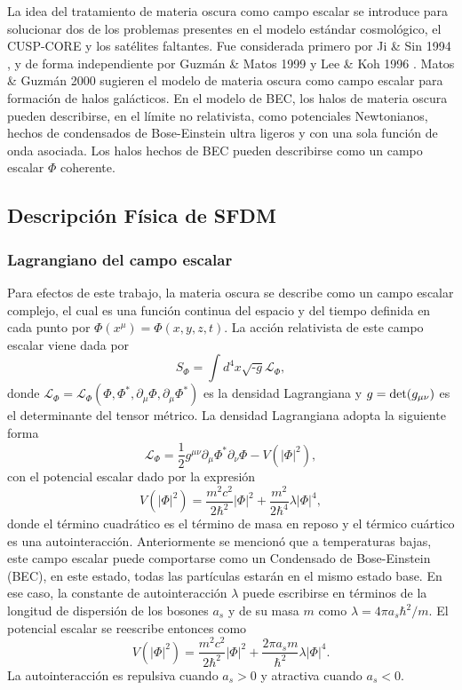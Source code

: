\documentclass[a4paper,openright,10pt, oneside, final]{book}
\begin{document}
La idea del tratamiento de materia oscura como campo escalar se introduce para solucionar dos de los problemas presentes en el modelo estándar cosmológico, el CUSP-CORE y los satélites faltantes. Fue considerada primero por Ji \& Sin 1994 \cite{1.3.01}, y de forma independiente por Guzmán \& Matos 1999 \cite{Siddhartha Matos} y Lee \& Koh 1996 \cite{1.3.02}. Matos \& Guzmán 2000 \cite{1.3.03} sugieren el modelo de materia oscura como campo escalar para formación de halos galácticos. En el modelo de BEC, los halos de materia oscura pueden describirse, en el límite no relativista, como potenciales Newtonianos, hechos de condensados de Bose-Einstein ultra ligeros y con una sola función de onda asociada. Los halos hechos de BEC pueden describirse como un campo escalar $\Phi$ coherente.


\subsection{Descripción Física de SFDM}
\subsubsection{Lagrangiano del campo escalar}
Para efectos de este trabajo, la materia oscura se describe como un campo escalar complejo, el cual es una función continua del espacio y del tiempo definida en cada punto por $\Phi(x^{\mu}) = \Phi(x, y, z, t) $. La acción relativista de este campo escalar viene dada por \cite{1.3.03.1} \begin{equation}
S_{\Phi} = \int d^{4}x\sqrt{\textbf{-} g}\mathcal{L}_{\Phi},\label{1.54}
\end{equation}
donde $\mathcal{L}_{\Phi} = \mathcal{L}_{\Phi}(\Phi, \Phi^{*},\partial_{\mu}\Phi,\partial_{\mu}\Phi^{*})$ es la densidad Lagrangiana y $g= \textup{det}(g_{\mu\nu})$ es el determinante del tensor métrico. La densidad Lagrangiana adopta la siguiente forma
\begin{equation}
\mathcal{L}_{\Phi} = \frac{1}{2}g^{\mu\nu}\partial_{\mu}\Phi^{*}\partial_{\nu}\Phi - V(|\Phi|^{2}),\label{1.55}
\end{equation}
con el potencial escalar dado por la expresión 
\begin{equation}
V(|\Phi|^{2}) = \frac{m^{2}c^{2}}{2\hbar^{2}}|\Phi|^{2} + \frac{m^{2}}{2\hbar^{4}}\lambda|\Phi|^{4},\label{1.56}
\end{equation}
donde el término cuadrático es el término de masa en reposo y el térmico cuártico es una autointeracción. Anteriormente se mencionó que a temperaturas bajas, este campo escalar puede comportarse como un Condensado de Bose-Einstein (BEC), en este estado, todas las partículas estarán en el mismo estado base. En ese caso, la constante de autointeracción $\lambda$ puede escribirse en términos de la longitud de dispersión  de los bosones $a_{s}$ y de su masa $m$ como $\lambda = 4\pi a_{s}\hbar^{2}/m $. El potencial escalar se reescribe entonces como
\begin{equation}
V(|\Phi|^{2}) = \frac{m^{2}c^{2}}{2\hbar^{2}}|\Phi|^{2} + \frac{2\pi a_{s}m}{\hbar^{2}}\lambda|\Phi|^{4}.\label{1.57}
\end{equation}
La autointeracción es repulsiva cuando $a_{s} > 0$ y atractiva cuando $a_{s} < 0$.
\end{document}
